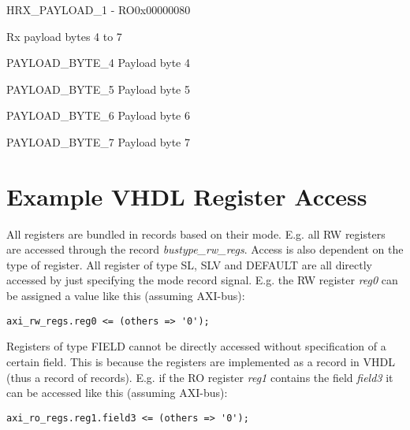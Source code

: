 \documentclass{article}
\begin{document}
\begin{register}{H}{RX{\_}PAYLOAD{\_}1 - RO}{0x00000080}  \par Rx payload bytes 4 to 7 \regnewline
  \label{RX_PAYLOAD_1}
\regnewline
  \begin{regdesc}\begin{reglist}
    \item [PAYLOAD{\_}BYTE{\_}4] Payload byte 4    \item [PAYLOAD{\_}BYTE{\_}5] Payload byte 5    \item [PAYLOAD{\_}BYTE{\_}6] Payload byte 6    \item [PAYLOAD{\_}BYTE{\_}7] Payload byte 7  \end{reglist}\end{regdesc}
\end{register}

\section{Example VHDL Register Access}

\par
All registers are bundled in records based on their mode. E.g. all RW registers are accessed through the record \textit{bustype\_rw\_regs}. Access is also dependent on the type of register. All register of type SL, SLV and DEFAULT are all directly accessed by just specifying the mode record signal. E.g. the RW register \textit{reg0} can be assigned a value like this (assuming AXI-bus):

\begin{lstlisting}[style=vhdl]
axi_rw_regs.reg0 <= (others => '0');
\end{lstlisting}

\par Registers of type FIELD cannot be directly accessed without specification of a certain field. This is because the registers are implemented as a record in VHDL (thus a record of records). E.g. if the RO register \textit{reg1} contains the field \textit{field3} it can be accessed like this (assuming AXI-bus):

\begin{lstlisting}[style=vhdl]
axi_ro_regs.reg1.field3 <= (others => '0');
\end{lstlisting}
\end{document}
